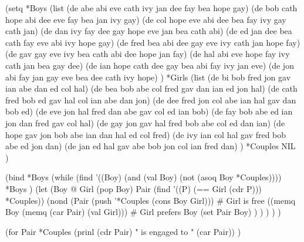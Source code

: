 \begin{wideverbatim}

(setq
   *Boys (list
      (de abe  abi eve cath ivy jan dee fay bea hope gay)
      (de bob  cath hope abi dee eve fay bea jan ivy gay)
      (de col  hope eve abi dee bea fay ivy gay cath jan)
      (de dan  ivy fay dee gay hope eve jan bea cath abi)
      (de ed   jan dee bea cath fay eve abi ivy hope gay)
      (de fred bea abi dee gay eve ivy cath jan hope fay)
      (de gav  gay eve ivy bea cath abi dee hope jan fay)
      (de hal  abi eve hope fay ivy cath jan bea gay dee)
      (de ian  hope cath dee gay bea abi fay ivy jan eve)
      (de jon  abi fay jan gay eve bea dee cath ivy hope) )
   *Girls (list
      (de bi   bob fred jon gav ian abe dan ed col hal)
      (de bea  bob abe col fred gav dan ian ed jon hal)
      (de cath fred bob ed gav hal col ian abe dan jon)
      (de dee  fred jon col abe ian hal gav dan bob ed)
      (de eve  jon hal fred dan abe gav col ed ian bob)
      (de fay  bob abe ed ian jon dan fred gav col hal)
      (de gay  jon gav hal fred bob abe col ed dan ian)
      (de hope gav jon bob abe ian dan hal ed col fred)
      (de ivy  ian col hal gav fred bob abe ed jon dan)
      (de jan  ed hal gav abe bob jon col ian fred dan) )
   *Couples NIL )

(bind *Boys
   (while
      (find
         '((Boy) (and (val Boy) (not (asoq Boy *Couples))))
         *Boys )
      (let (Boy @  Girl (pop Boy)  Pair (find '((P) (== Girl (cdr P))) *Couples))
         (nond
            (Pair (push '*Couples (cons Boy Girl)))   # Girl is free
            ((memq Boy (memq (car Pair) (val Girl)))  # Girl prefers Boy
               (set Pair Boy) ) ) ) ) )

(for Pair *Couples
   (prinl (cdr Pair) " is engaged to " (car Pair)) )

\end{wideverbatim}

